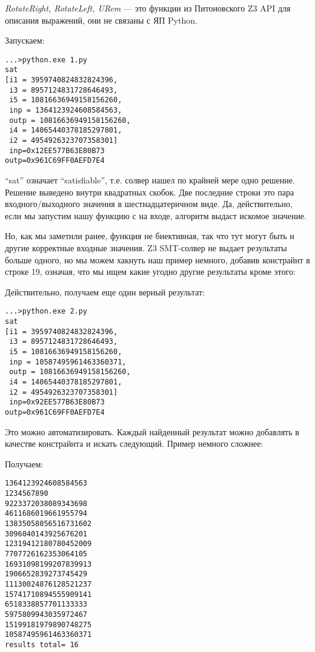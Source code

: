 \textit{RotateRight, RotateLeft, URem} --- это функции из Питоновского Z3 \ac{API} для описания выражений, 
они не связаны с ЯП Python.

Запускаем:

\begin{lstlisting}
...>python.exe 1.py
sat
[i1 = 3959740824832824396,
 i3 = 8957124831728646493,
 i5 = 10816636949158156260,
 inp = 1364123924608584563,
 outp = 10816636949158156260,
 i4 = 14065440378185297801,
 i2 = 4954926323707358301]
 inp=0x12EE577B63E80B73
outp=0x961C69FF0AEFD7E4
\end{lstlisting}

``sat'' означает ``satisfiable'', т.е. солвер нашел по крайней мере одно решение.
Решение выведено внутри квадратных скобок.
Две последние строки это пара входного/выходного значения в шестнадцатеричном виде.
Да, действительно, если мы запустим нашу функцию с
 на входе, алгоритм выдаст искомое значение.

Но, как мы заметили ранее, функция не биективная, так что тут могут быть и другие корректные входные значения.
Z3 SMT-солвер не выдает результаты больше одного, но мы можем хакнуть наш пример немного, 
добавив констрайнт в строке 19, означая, что мы ищем какие угодно другие результаты кроме этого:



Действительно, получаем еще один верный результат:

\begin{lstlisting}
...>python.exe 2.py
sat
[i1 = 3959740824832824396,
 i3 = 8957124831728646493,
 i5 = 10816636949158156260,
 inp = 10587495961463360371,
 outp = 10816636949158156260,
 i4 = 14065440378185297801,
 i2 = 4954926323707358301]
 inp=0x92EE577B63E80B73
outp=0x961C69FF0AEFD7E4
\end{lstlisting}

Это можно автоматизировать.
Каждый найденный результат можно добавлять в качестве констрайнта и искать следующий.
Пример немного сложнее:



Получаем:

\begin{lstlisting}
1364123924608584563
1234567890
9223372038089343698
4611686019661955794
13835058056516731602
3096040143925676201
12319412180780452009
7707726162353064105
16931098199207839913
1906652839273745429
11130024876128521237
15741710894555909141
6518338857701133333
5975809943035972467
15199181979890748275
10587495961463360371
results total= 16
\end{lstlisting}

